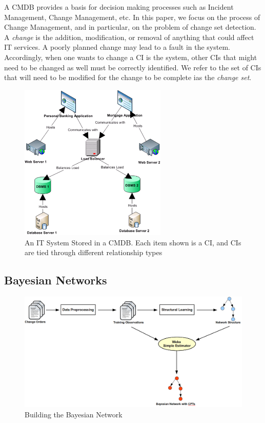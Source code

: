 \documentclass[10pt,twocolumn,letterpaper]{article}
\begin{document}
A CMDB provides a basis for decision making processes such as Incident Management, Change Management, etc.  In this paper, we focus on the process of Change
Management, and in particular, on the problem of change set detection. A \textit{change} is the addition, modification, or removal of anything that could
affect IT services. A poorly planned change may lead to a fault in the system. Accordingly, when one wants to change a CI is the system, other CIs that might
need to be changed as well must be correctly identified. We refer to the set of CIs that will need to be modified for the change to be complete ias the
\textit{change set}.

\begin{figure}[!t]
\centering
\includegraphics[width=7cm]{cmdbExample.PNG}
\caption{An IT System Stored in a CMDB. Each item shown is a CI, and CIs are tied through different relationship types}
\label{fig:cmdbExample}
\end{figure}

\subsection{Bayesian Networks}

\begin{figure}[!t]
\centering
\includegraphics[width=15cm]{graphics/constructingmodel.png}
\caption{Building the Bayesian Network}
\label{fig:process}
\end{figure}
\end{document}
